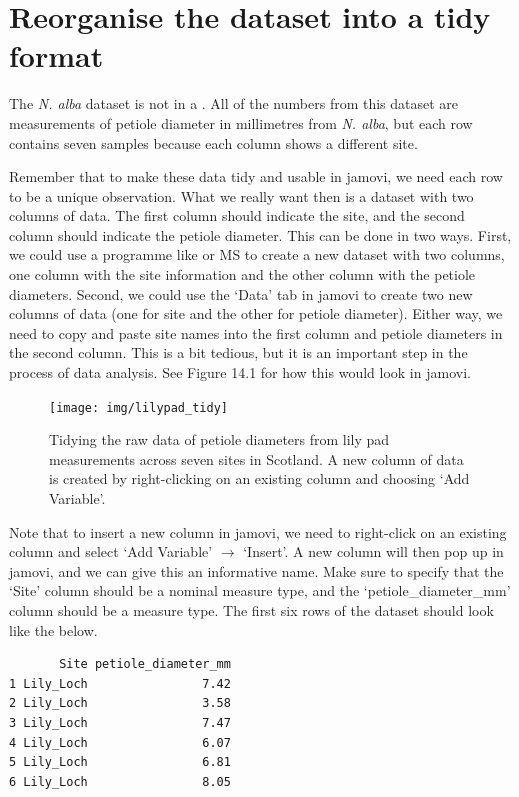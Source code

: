 \documentclass[
  openany]{krantz}
\begin{document}
\hypertarget{reorganise-the-dataset-into-a-tidy-format}{%
\section{Reorganise the dataset into a tidy format}\label{reorganise-the-dataset-into-a-tidy-format}}

The \emph{N. alba} dataset is not in a .
All of the numbers from this dataset are measurements of petiole diameter in millimetres from \emph{N. alba}, but each row contains seven samples because each column shows a different site.

Remember that to make these data tidy and usable in jamovi, we need each row to be a unique observation.
What we really want then is a dataset with two columns of data.
The first column should indicate the site, and the second column should indicate the petiole diameter.
This can be done in two ways.
First, we could use a  programme like  or MS  to create a new dataset with two columns, one column with the site information and the other column with the petiole diameters.
Second, we could use the `Data' tab in jamovi to create two new columns of data (one for site and the other for petiole diameter).
Either way, we need to copy and paste site names into the first column and petiole diameters in the second column.
This is a bit tedious, but it is an important step in the process of data analysis.
See Figure 14.1 for how this would look in jamovi.

\begin{figure}
\texttt{[image: img/lilypad\_tidy]} \caption{Tidying the raw data of petiole diameters from lily pad measurements across seven sites in Scotland. A new column of data is created by right-clicking on an existing column and choosing `Add Variable'.}\label{fig:unnamed-chunk-46}
\end{figure}

Note that to insert a new column in jamovi, we need to right-click on an existing column and select `Add Variable' \(\to\) `Insert'.
A new column will then pop up in jamovi, and we can give this an informative name.
Make sure to specify that the `Site' column should be a nominal measure type, and the `petiole\_diameter\_mm' column should be a  measure type.
The first six rows of the dataset should look like the below.

\begin{verbatim}
       Site petiole_diameter_mm
1 Lily_Loch                7.42
2 Lily_Loch                3.58
3 Lily_Loch                7.47
4 Lily_Loch                6.07
5 Lily_Loch                6.81
6 Lily_Loch                8.05
\end{verbatim}
\end{document}
